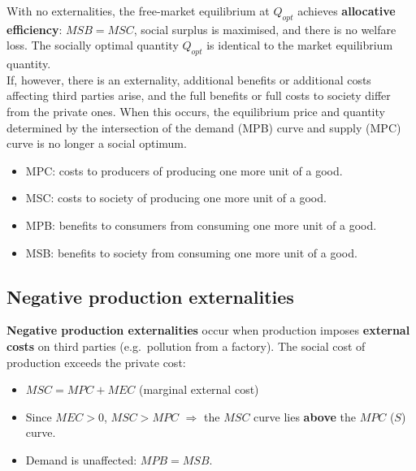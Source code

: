 \documentclass[a4paper,12pt]{article}
\begin{document}
\begin{center}
\end{center}
With no externalities, the free-market equilibrium at $Q_{opt}$ achieves \textbf{allocative efficiency}: $MSB = MSC$, social surplus is maximised, and there is no welfare loss. The socially optimal quantity $Q_{opt}$ is identical to the market equilibrium quantity.
\\If, however, there is an externality, additional benefits 
or additional costs affecting third parties arise, and the full benefits or full costs to society differ from the private ones. When this occurs, the equilibrium price and quantity determined by the intersection of the demand (MPB) curve and supply (MPC) curve is no longer a social optimum.
\begin{itemize}
  \item MPC: costs to producers of producing one more unit of a good.
  \item MSC: costs to society of producing one more unit of a good.
  \item MPB: benefits to consumers from consuming one more unit of a good.
  \item MSB: benefits to society from consuming one more unit of a good.
\end{itemize}
\subsection{Negative production externalities}
\textbf{Negative production externalities} occur when production imposes \textbf{external costs} on third parties (e.g.\ pollution from a factory). The social cost of production exceeds the private cost:
\begin{itemize}
  \item $MSC = MPC + MEC$ (marginal external cost)
  \item Since $MEC > 0$, $MSC > MPC$ $\Rightarrow$ the $MSC$ curve lies \textbf{above} the $MPC$ ($S$) curve.
  \item Demand is unaffected: $MPB = MSB$.
\end{itemize}
\end{document}

